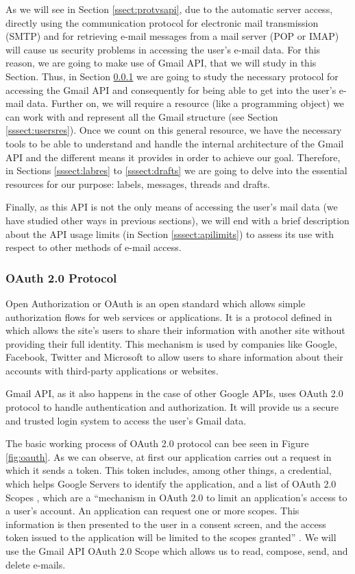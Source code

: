 As we will see in Section \ref{ssect:protvsapi}, due to the automatic server access, directly using the communication protocol for electronic mail transmission (SMTP) and for retrieving e-mail messages from a mail server (POP or IMAP) will cause us security problems in accessing the user's e-mail data. For this reason, we are going to make use of Gmail API, that we will study in this Section. Thus, in Section \ref{sssect:oauth} we are going to study the necessary protocol for accessing the Gmail API and consequently for being able to get into the user's e-mail data. Further on, we will require a resource (like a programming object) we can work with and represent all the Gmail structure (see Section \ref{sssect:usersres}). Once we count on this general resource, we have the necessary tools to be able to understand and handle the internal architecture of the Gmail API and the different means it provides in order to achieve our goal. Therefore, in Sections \ref{sssect:labres} to \ref{sssect:drafts} we are going to delve into the essential resources for our purpose: labels, messages, threads and drafts.

Finally, as this API is not the only means of accessing the user's mail data (we have studied other ways in previous sections), we will end with a brief description about the API usage limits (in Section \ref{sssect:apilimits}) to assess its use with respect to other methods of e-mail access.

\subsubsection{OAuth 2.0 Protocol}\label{sssect:oauth}
Open Authorization or OAuth \citep{oauth} is an open standard which allows simple authorization flows for web services or applications. It is a protocol defined in \cite{rfc6749} which allows the site's users to share their information with another site without providing their full identity. This mechanism is used by companies like Google, Facebook, Twitter and Microsoft to allow users to share information about their accounts with third-party applications or websites.

Gmail API, as it also happens in the case of other Google APIs, uses OAuth 2.0 protocol \citep{oauthforgoogle} to handle authentication and authorization. It will provide us a secure and trusted login system to access the user's Gmail data.

The basic working process of OAuth 2.0 protocol can bee seen in Figure \ref{fig:oauth}. As we can observe, at first our application carries out a request in which it sends a token. This token includes, among other things, a credential, which helps Google Servers  to identify the application, and a list of OAuth 2.0 Scopes \citep{oauth-scopes-google}, which are a ``mechanism  in OAuth 2.0 to limit an application's access to a user's account. An application can request one or more scopes. This information is then presented to the user in a consent screen, and the access token issued to the application will be limited to the scopes granted'' \citep{oauth-scopes}. We will use the Gmail API OAuth 2.0 Scope which allows us to read, compose, send, and delete e-mails.

